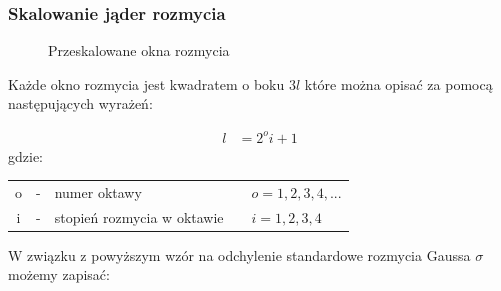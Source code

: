 \subsubsection{Skalowanie jąder rozmycia}
\begin{figure}[!htb]
\centering
{}
\caption{Przeskalowane okna rozmycia}
\label{fig:surf_bay_prescale_gaussian}
\end{figure}
Każde okno rozmycia jest kwadratem o boku $3l$ które można opisać za pomocą następujących wyrażeń:

\begin{align}
 l &= 2^oi+1
\label{eqn:liczym_l}
\end{align}
gdzie:

{\centering
\begin{tabular}{cclll}
o & - &  numer oktawy     &&$o=1,2,3,4,...$\\ 
i & - & stopień rozmycia w oktawie &&$i=1,2,3,4$\\ 
\end{tabular} 
}


W związku z powyższym wzór na odchylenie standardowe rozmycia Gaussa $\sigma$ możemy zapisać:

